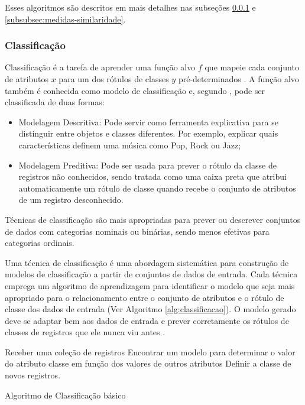 Esses algoritmos são descritos em mais detalhes nas subseções  \ref{subsubsec:classificacao} e \ref{subsubsec:medidas-similaridade}.

\subsubsection{Classificação} \label{subsubsec:classificacao}
Classificação é a tarefa de aprender uma função alvo \textbf{\({f}\)} que mapeie cada conjunto de atributos \textbf{\({x}\)} para um dos rótulos de classes \textbf{\({y}\)} pré-determinados \cite{pang2009}. A função alvo também é conhecida como modelo de classificação e, segundo , pode ser classificada de duas formas:

\begin{itemize}
    \item Modelagem Descritiva: Pode servir como ferramenta explicativa para se distinguir entre objetos e classes diferentes. Por exemplo, explicar quais características definem uma música como Pop, Rock ou Jazz;
    
    \item Modelagem Preditiva: Pode ser usada para prever o rótulo da classe de registros não conhecidos, sendo tratada como uma caixa preta que atribui automaticamente um rótulo de classe quando recebe o conjunto de atributos de um registro desconhecido.
\end{itemize}

Técnicas de classificação são mais apropriadas para prever ou descrever conjuntos de dados com categorias nominais ou binárias, sendo menos efetivas para categorias ordinais.

Uma técnica de classificação é uma abordagem sistemática para construção de modelos de classificação a partir de conjuntos de dados de entrada. Cada técnica emprega um algoritmo de aprendizagem para identificar o modelo que seja mais apropriado para o relacionamento entre o conjunto de atributos e o rótulo de classe dos dados de entrada (Ver Algoritmo \ref{alg:classificacao}). O modelo gerado deve se adaptar bem aos dados de entrada e prever corretamente os rótulos de classes de registros que ele nunca viu antes \cite{pang2009}.

\begin{algorithm}[!htb]
    \SetAlgoLined
    Receber uma coleção de registros\;
    Encontrar um modelo  para determinar o valor do atributo classe em função dos valores de outros atributos\;
    Definir a classe de novos registros.
\caption{Algoritmo de Classificação básico}
\label{alg:classificacao}
\end{algorithm}

